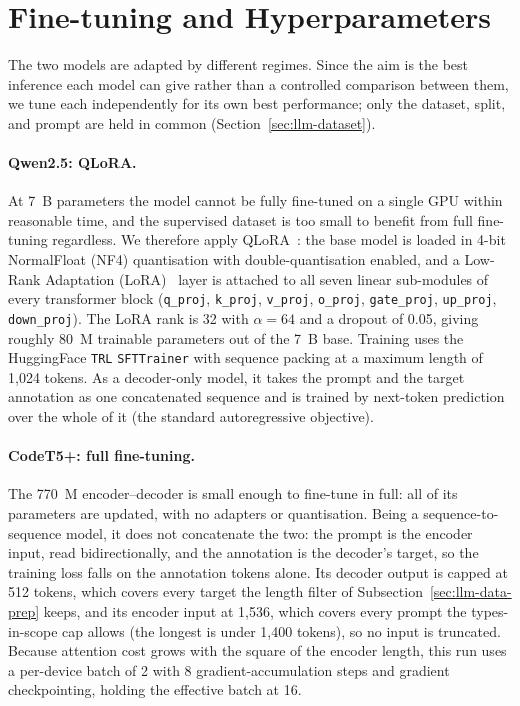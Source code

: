\section{Fine-tuning and Hyperparameters}
\label{sec:llm-training}

The two models are adapted by different regimes. 
Since the aim is the best inference each model can give rather than a controlled comparison between them, we tune each independently for its own best performance; only the dataset, split, and prompt are held in common (Section~\ref{sec:llm-dataset}).

\paragraph{Qwen2.5: QLoRA.}
At 7~B parameters the model cannot be fully fine-tuned on a single GPU within reasonable time, and the supervised dataset is too small to benefit from full fine-tuning regardless.
We therefore apply QLoRA~\cite{qlora}: the base model is loaded in 4-bit NormalFloat (NF4) quantisation with double-quantisation enabled, and a Low-Rank Adaptation (LoRA)~\cite{lora} layer is attached to all seven linear sub-modules of every transformer block (\texttt{q\_proj}, \texttt{k\_proj}, \texttt{v\_proj}, \texttt{o\_proj}, \texttt{gate\_proj}, \texttt{up\_proj}, \texttt{down\_proj}).
The LoRA rank is 32 with $\alpha = 64$ and a dropout of 0.05, giving roughly 80~M trainable parameters out of the 7~B base.
Training uses the HuggingFace \texttt{TRL} \texttt{SFTTrainer} with sequence packing at a maximum length of 1{,}024 tokens.
As a decoder-only model, it takes the prompt and the target annotation as one concatenated sequence and is trained by next-token prediction over the whole of it (the standard autoregressive objective).

\paragraph{CodeT5+: full fine-tuning.}
The 770~M encoder--decoder is small enough to fine-tune in full: all of its parameters are updated, with no adapters or quantisation.
Being a sequence-to-sequence model, it does not concatenate the two: the prompt is the encoder input, read bidirectionally, and the annotation is the decoder's target, so the training loss falls on the annotation tokens alone.
Its decoder output is capped at 512 tokens, which covers every target the length filter of Subsection~\ref{sec:llm-data-prep} keeps, and its encoder input at 1{,}536, which covers every prompt the types-in-scope cap allows (the longest is under 1{,}400 tokens), so no input is truncated.
Because attention cost grows with the square of the encoder length, this run uses a per-device batch of 2 with 8 gradient-accumulation steps and gradient checkpointing, holding the effective batch at 16.

